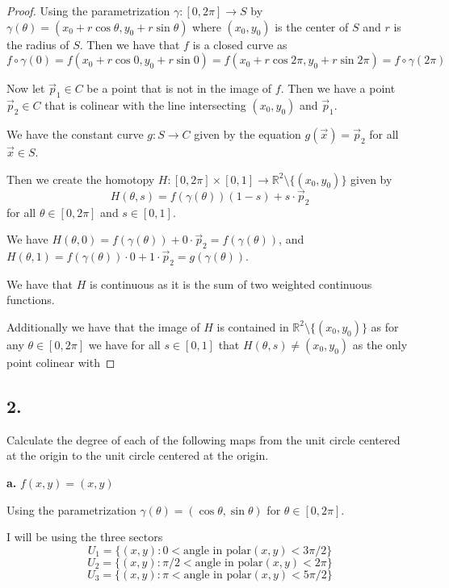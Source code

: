 \documentclass{amsart}
\theoremstyle{plain}
\theoremstyle{definition}
\theoremstyle{remark}
\begin{document}
\begin{proof}
    Using the parametrization $\gamma:[0,2\pi]\to S$ by $\gamma(\theta)=(x_0+r\cos \theta, y_0 +r\sin \theta )$ where $(x_0,y_0)$ is the center of $S$ and $r$ is the radius of $S$. Then we have that $f$ is a closed curve as $$f\circ \gamma(0)=f(x_0+r\cos 0, y_0 +r\sin 0)=f(x_0+r\cos 2\pi , y_0 +r\sin 2\pi)=f\circ \gamma(2\pi)$$
    
    Now let $\vec p_1\in C$ be a point that is not in the image of $f$. Then we have a point $\vec p_2\in C$ that is colinear with the line intersecting $(x_0,y_0)$ and $\vec p_1$. 

    We have the constant curve $g: S \to C$ given by the equation $g(\vec x) = \vec p_2$ for all $\vec x\in S$. 
    
    
    Then we create the homotopy $H:[0,2\pi]\times [0,1]\to \mathbb{R}^2\setminus \{(x_0,y_0)\}$ given by $$H(\theta,s)=f(\gamma (\theta))(1-s)+s\cdot \vec p_2$$ for all $\theta \in [0,2\pi]$ and $s\in [0,1]$. 

    We have $H(\theta,0)=f(\gamma (\theta))+0\cdot \vec p_2=f(\gamma(\theta))$, and $H(\theta,1)=f(\gamma(\theta ))\cdot 0 + 1\cdot \vec p_2=g(\gamma (\theta))$. 

    We have that $H$ is continuous as it is the sum of two weighted continuous functions. 
    
    Additionally we have that the image of $H$ is contained in $\mathbb{R}^2\setminus \{(x_0,y_0)\}$ as for any $\theta\in [0,2\pi]$ we have for all $s\in[0,1]$ that $H(\theta,s)\neq (x_0,y_0)$ as the only point colinear with 

    

\end{proof}





\vspace{.15in}
\noindent
\subsection*{2.} Calculate the degree of each of the following maps from the unit circle centered at the origin to the unit circle centered at the origin. 



\vspace{.1in}
{\bfseries a.}  $f(x,y) = (x,y)$
{
Using the parametrization $\gamma(\theta)=(\cos \theta,\sin \theta)$ for $\theta \in [0,2\pi]$. 


I will be using the three sectors  $$U_1=\{(x,y): 0< \text{angle in polar}(x,y)<3\pi/2\}$$  
$$
U_2=\{(x,y): \pi/2 < \text{angle in polar}(x,y)<2\pi\}
$$
$$
U_3=\{(x,y): \pi < \text{angle in polar}(x,y)< 5\pi/2\}
$$

}
\end{document}

